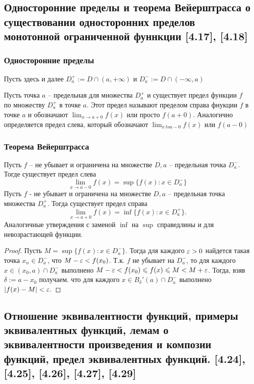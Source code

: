 \documentclass[12pt, a4paper]{article}
\begin{document}
    \subsection{Односторонние пределы и теорема Вейерштрасса о существовании односторонних пределов монотонной ограниченной фуннкции [4.17], [4.18]}
    \subsubsection{Односторонние пределы}
    Пусть здесь и далее $D^{+}_a := D \cap (a, + \infty)$ и $D^{-}_a := D \cap (-\infty, a)$

    Пусть точка $a$ -- предельная для множества $D^{+}_a$ и существует предел функции $f$ по множеству $D^{+}_a$ в точке $a$. Этот предел называют пределом справа фнукции $f$ в точке $a$ и обозначают $\lim_{x \to a + 0} f(x)$ или просто $f(a + 0)$. Аналогично определяется предел слева, который обозначают $\lim_{x \ to a - 0} f(x)$ или $f(a - 0)$
    \subsubsection{Теорема Вейерштрасса}
    Пусть $f$ -- не убывает и ограничена на множестве $D, a$ -- предельная точка $D^{-}_a$. Тогде существует предел слева
    \begin{equation*}
        \lim_{x \to a - 0} f(x) = \sup \{f(x) \colon x \in D^{-}_a\}
    \end{equation*}
    Пусть $f$ - не убывает и ограничена на множестве $D, a$ -- предельная точка множества $D^{+}_a$. Тогда существует предел справа
    \begin{equation*}
        \lim_{x \to a + 0} f(x) = \inf \{f(x) \colon x \in D^{+}_a\}.
    \end{equation*}
    Аналогичные утверждения с заменой $\inf$ на $\sup$ справедлины и для невозрастающей функции.
    \begin{proof}
    Пусть $M = \sup \{f(x) : x \in D_a^-\}$. Тогда для каждого $\varepsilon > 0$ найдется такая точка $x_n \in D_a^-$, что $M - \varepsilon < f(x_0)$. Т.к. $f$ не убывает на $D_a^-$, то для каждого $x \in (x_0, a) \cap D_a^-$ выполнено $M - \varepsilon < f(x_0) \leqslant f(x) \leqslant M < M + \varepsilon$. Тогда, взяв $\delta := a - x_0$ получаем. что для каждого $x \in B_{\delta}'(a) \cap D_{a}^-$ выполнено $|f(x) - M| < \varepsilon.$
    \end{proof}
    \subsection{Отношение эквивалентности функций, примеры эквивалентных функций, лемам о эквивалентности произведения и композии функций, предел эквивалентных функций. [4.24], [4.25], [4.26], [4.27], [4.29]}
\end{document}
